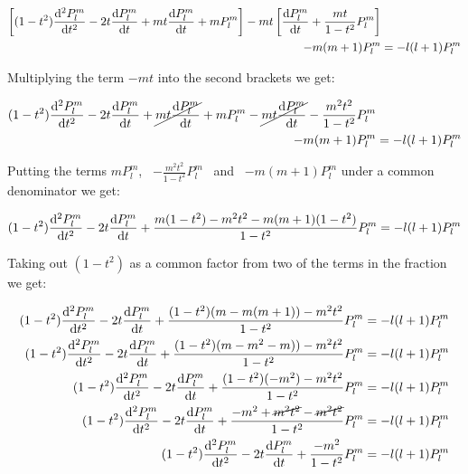 \documentclass{article}
\begin{document}
    \begin{equation}
        \begin{aligned}
            \left[(1 - t^2)\odv[order = 2]{P^{m}_{l}}{t} - 2t\odv{P^{m}_{l}}{t} + mt\odv{P^{m}_{l}}{t} + mP^{m}_{l}\right]
            - mt\left[\odv{P^{m}_{l}}{t} + \frac{mt}{1 - t^2}P^{m}_{l}\right]& \\
            - m(m + 1)P^{m}_{l} &= -l(l + 1)P^{m}_{l}
        \end{aligned}
    \end{equation}

    Multiplying the term $-mt$ into the second brackets we get:

    \begin{equation}
        \begin{aligned}
            (1 - t^2)\odv[order = 2]{P^{m}_{l}}{t} - 2t\odv{P^{m}_{l}}{t} + \cancel{mt\odv{P^{m}_{l}}{t}} + mP^{m}_{l}
            - \cancel{mt\odv{P^{m}_{l}}{t}} - \frac{m^2t^2}{1 - t^2}P^{m}_{l}& \\
            - m(m + 1)P^{m}_{l} &= -l(l + 1)P^{m}_{l}
        \end{aligned}
    \end{equation}

    Putting the terms $mP^{m}_{l}$, \ $-\frac{m^2t^2}{1 - t^2}P^{m}_{l}$ \ and \ $-m(m+1)P^{m}_{l}$ under a common denominator we get:

    \begin{equation}
        (1 - t^2)\odv[order = 2]{P^{m}_{l}}{t} - 2t\odv{P^{m}_{l}}{t} + \frac{m(1 - t^2) - m^2t^2 - m(m + 1)(1 - t^2)}{1 - t^2}P^{m}_{l} = -l(l + 1)P^{m}_{l}
    \end{equation}

    Taking out $(1 - t^2)$ as a common factor from two of the terms in the fraction we get:

    \begin{align}
        (1 - t^2)\odv[order = 2]{P^{m}_{l}}{t} - 2t\odv{P^{m}_{l}}{t} + \frac{(1 - t^2)(m - m(m + 1)) - m^2t^2}{1 - t^2}P^{m}_{l} &= -l(l + 1)P^{m}_{l} \\
        (1 - t^2)\odv[order = 2]{P^{m}_{l}}{t} - 2t\odv{P^{m}_{l}}{t} + \frac{(1 - t^2)(m - m^2 - m)) - m^2t^2}{1 - t^2}P^{m}_{l} &= -l(l + 1)P^{m}_{l} \\
        (1 - t^2)\odv[order = 2]{P^{m}_{l}}{t} - 2t\odv{P^{m}_{l}}{t} + \frac{(1 - t^2)(-m^2) - m^2t^2}{1 - t^2}P^{m}_{l} &= -l(l + 1)P^{m}_{l} \\
        (1 - t^2)\odv[order = 2]{P^{m}_{l}}{t} - 2t\odv{P^{m}_{l}}{t} + \frac{-m^2 + \cancel{m^2t^2} - \cancel{m^2t^2}}{1 - t^2}P^{m}_{l} &= -l(l + 1)P^{m}_{l} \\
        (1 - t^2)\odv[order = 2]{P^{m}_{l}}{t} - 2t\odv{P^{m}_{l}}{t} + \frac{-m^2}{1 - t^2}P^{m}_{l} &= -l(l + 1)P^{m}_{l}
    \end{align}
\end{document}
